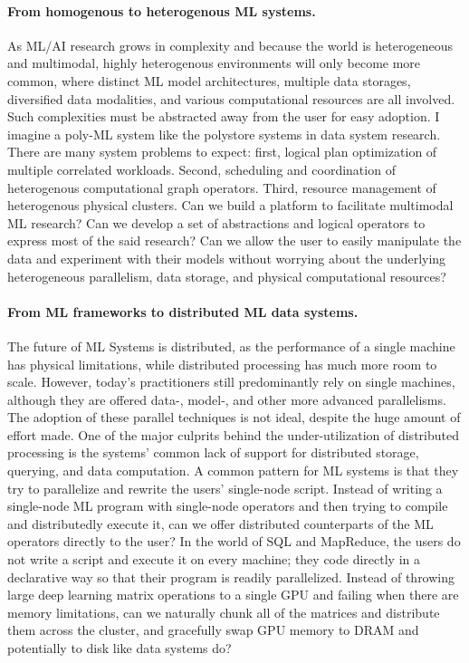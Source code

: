 \documentclass[letterpaper]{article}
\begin{document}
\paragraph{From homogenous to heterogenous ML systems.} As ML/AI research grows in complexity and because the world is heterogeneous and multimodal, highly heterogenous environments will only become more common, where distinct ML model architectures, multiple data storages, diversified data modalities, and various computational resources are all involved. Such complexities must be abstracted away from the user for easy adoption. I imagine a poly-ML system like the polystore systems in data system research. There are many system problems to expect: first, logical plan optimization of multiple correlated workloads. Second, scheduling and coordination of heterogenous computational graph operators. Third, resource management of heterogenous physical clusters. Can we build a platform to facilitate multimodal ML research? Can we develop a set of abstractions and logical operators to express most of the said research? Can we allow the user to easily manipulate the data and experiment with their models without worrying about the underlying heterogeneous parallelism, data storage, and physical computational resources? 

\paragraph{From ML frameworks to distributed ML data systems.} The future of ML Systems is distributed, as the performance of a single machine has physical limitations, while distributed processing has much more room to scale. However, today's practitioners still predominantly rely on single machines, although they are offered data-, model-, and other more advanced parallelisms. The adoption of these parallel techniques is not ideal, despite the huge amount of effort made. One of the major culprits behind the under-utilization of distributed processing is the systems' common lack of support for distributed storage, querying, and data computation. A common pattern for ML systems is that they try to parallelize and rewrite the users' single-node script. Instead of writing a single-node ML program with single-node operators and then trying to compile and distributedly execute it, can we offer distributed counterparts of the ML operators directly to the user? In the world of SQL and MapReduce, the users do not write a script and execute it on every machine; they code directly in a declarative way so that their program is readily parallelized. Instead of throwing large deep learning matrix operations to a single GPU and failing when there are memory limitations, can we naturally chunk all of the matrices and distribute them across the cluster, and gracefully swap GPU memory to DRAM and potentially to disk like data systems do? 
\end{document}
